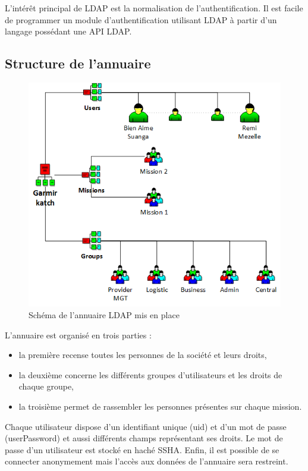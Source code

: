 L'intérêt principal de LDAP est la normalisation de l'authentification. Il est facile de programmer un module d'authentification utilisant LDAP à partir d'un langage possédant une API LDAP.
\subsection{Structure de l'annuaire}
\begin{figure}[htbp]
	\centering
	\includegraphics[scale=0.9]{Images/SchemaLDAP.png}
	\caption{Schéma de l'annuaire LDAP mis en place}
	\label{SchemaLDAP}
\end{figure}
L’annuaire est organisé en trois parties :
\begin{itemize}
\item la première recense toutes les personnes de la société et leurs droits,
\item la deuxième concerne les différents groupes d’utilisateurs et les droits de chaque groupe,
\item la troisième permet de rassembler les personnes présentes sur chaque mission.
\end{itemize}

Chaque utilisateur dispose d’un identifiant unique (uid) et d’un mot de passe (userPassword) et aussi différents champs représentant ses droits. Le mot de passe d’un utilisateur est stocké en haché SSHA. Enfin, il est possible de se connecter anonymement mais l’accès aux données de l’annuaire sera restreint.

